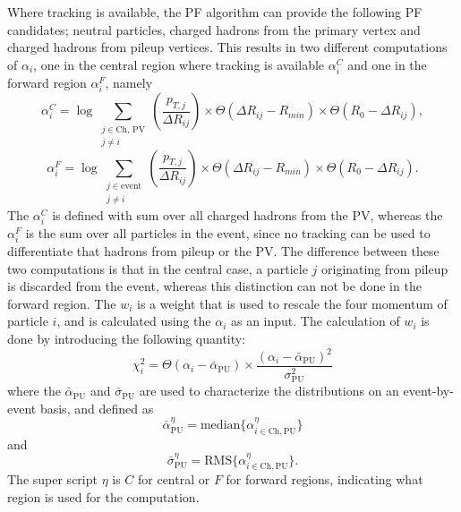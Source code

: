 Where tracking is available, the PF algorithm can provide the following PF candidates; neutral particles, charged hadrons from the primary vertex and charged hadrons from pileup vertices.   
This results in two different computations of $\alpha_{i}$, one in the central region where tracking is available $\alpha_i^{C}$ and one in the forward region $\alpha_i^{F}$, namely
\begin{equation}
  \alpha_i^{C} = \log \sum_{\substack{j \in \text{Ch, PV} \\ j \neq i}} \left(\frac{p_{T, j}}{\Delta R_{ij}}\right) \times \Theta(\Delta R_{ij}-R_{min})\times \Theta(R_{0}-\Delta R_{ij}),
\end{equation}
\begin{equation}
  \alpha_i^{F} = \log \sum_{\substack{j \in \text{event} \\ j \neq i}} \left(\frac{p_{T, j}}{\Delta R_{ij}}\right) \times \Theta(\Delta R_{ij}-R_{min})\times \Theta(R_{0}-\Delta R_{ij}).
\end{equation}
The $\alpha_{i}^{C}$ is defined with sum over all charged hadrons from the PV, whereas the $\alpha_{i}^{F}$ is the sum over all particles in the event, since no tracking can be used to differentiate that hadrons from pileup or the PV. 
The difference between these two computations is that in the central case, a particle $j$ originating from pileup is discarded from the event, whereas this distinction can not be done in the forward region. 
The $w_{i}$ is a weight that is used to rescale the four momentum of particle $i$, and is calculated using the $\alpha_{i}$ as an input. 
The calculation of $w_{i}$ is done by introducing the following quantity:
\begin{equation}
\chi_i^2=\Theta(\alpha_{i}-\bar{\alpha}_{\text{PU}})\times \frac{(\alpha_{i}-\bar{\alpha}_{\mathrm{PU}})^{2}}{\sigma_{\mathrm{PU}}^{2}}
\label{eq:chi2}
\end{equation}
where the $\bar{\alpha}_{\text{PU}}$ and $\bar{\sigma}_{\text{PU}}$ are used to characterize the distributions on an event-by-event basis, and defined as
\begin{equation}
\bar{\alpha}_{\text{PU}}^{\eta}= \mathrm{median}\{\alpha_{i\in \mathrm{Ch, PU}}^{\eta}\} 
\end{equation}
and
\begin{equation}
\bar{\sigma}_{\text{PU}}^{\eta}= \mathrm{RMS}\{\alpha_{i\in \mathrm{Ch, PU}}^{\eta}\}.
\end{equation} 
The super script $\eta$ is $C$ for central or $F$ for forward regions, indicating what region is used for the computation. 

